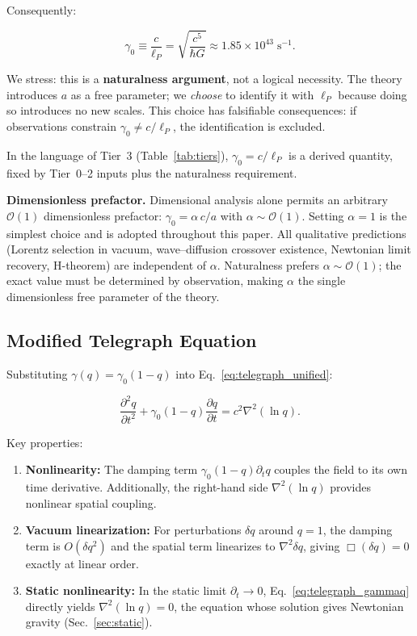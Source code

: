 \documentclass[aps,prd,twocolumn,showpacs,superscriptaddress,preprintnumbers]{revtex4-2}
\begin{document}
Consequently:

\begin{equation}
\boxed{\gamma_0 \equiv \frac{c}{\ell_P} = \sqrt{\frac{c^5}{\hbar G}} \approx 1.85 \times 10^{43}\;\text{s}^{-1}}.
\label{eq:gamma0}
\end{equation}

We stress: this is a \textbf{naturalness argument}, not a logical necessity.
The theory introduces $a$ as a free parameter; we \emph{choose} to identify it with $\ell_P$ because doing so introduces no new scales.
This choice has falsifiable consequences: if observations constrain $\gamma_0 \neq c/\ell_P$, the identification is excluded.

In the language of Tier~3 (Table~\ref{tab:tiers}), $\gamma_0=c/\ell_P$ is a derived quantity, fixed by Tier~0--2 inputs plus the naturalness requirement.

\textbf{Dimensionless prefactor.}
Dimensional analysis alone permits an arbitrary $\mathcal{O}(1)$ dimensionless prefactor: $\gamma_0 = \alpha\,c/a$ with $\alpha\sim\mathcal{O}(1)$.
Setting $\alpha=1$ is the simplest choice and is adopted throughout this paper.
All qualitative predictions (Lorentz selection in vacuum, wave--diffusion crossover existence, Newtonian limit recovery, H-theorem) are independent of $\alpha$.
Naturalness prefers $\alpha\sim\mathcal{O}(1)$; the exact value must be determined by observation, making $\alpha$ the single dimensionless free parameter of the theory.

\subsection{Modified Telegraph Equation}

Substituting $\gamma(q)=\gamma_0(1-q)$ into Eq.~\eqref{eq:telegraph_unified}:

\begin{equation}
\boxed{\frac{\partial^2 q}{\partial t^2} + \gamma_0(1-q)\frac{\partial q}{\partial t} = c^2\nabla^2(\ln q)}.
\label{eq:telegraph_gammaq}
\end{equation}

Key properties:
\begin{enumerate}
    \item \textbf{Nonlinearity:} The damping term $\gamma_0(1-q)\partial_t q$ couples the field to its own time derivative. Additionally, the right-hand side $\nabla^2(\ln q)$ provides nonlinear spatial coupling.
    \item \textbf{Vacuum linearization:} For perturbations $\delta q$ around $q=1$, the damping term is $O(\delta q^2)$ and the spatial term linearizes to $\nabla^2\delta q$, giving $\Box(\delta q)=0$ exactly at linear order.
    \item \textbf{Static nonlinearity:} In the static limit $\partial_t\to0$, Eq.~\eqref{eq:telegraph_gammaq} directly yields $\nabla^2(\ln q)=0$, the equation whose solution gives Newtonian gravity (Sec.~\ref{sec:static}).
\end{enumerate}
\end{document}
